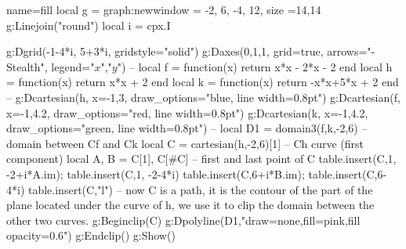 \documentclass[12pt]{standalone}
\begin{document}
\begin{luadraw}{name=fill}
local g = graph:new{window = {-2, 6, -4, 12}, size ={14,14}}
g:Linejoin("round")
local i = cpx.I 

g:Dgrid({-1-4*i, 5+3*i}, {gridstyle="solid"})
g:Daxes({0,1,1}, {grid=true, arrows="-Stealth", legend={"$x$","$y$"}})
--
local f = function(x) return x*x - 2*x - 2 end
local h = function(x) return x*x + 2 end
local k = function(x) return -x*x+5*x + 2 end
--
g:Dcartesian(h, {x={-1,3}, draw_options="blue, line width=0.8pt"})
g:Dcartesian(f, {x={-1,4.2}, draw_options="red, line width=0.8pt"})
g:Dcartesian(k, {x={-1,4.2}, draw_options="green, line width=0.8pt"})
--
local D1 = domain3(f,k,-2,6) -- domain between Cf and Ck
local C = cartesian(h,-2,6)[1] -- Ch curve (first component)
local A, B = C[1], C[#C] -- first and last point of C
table.insert(C,1, -2+i*A.im); table.insert(C,1, -2-4*i)
table.insert(C,6+i*B.im); table.insert(C,6-4*i)
table.insert(C,"l")
-- now C is a path, it is the contour of the part of the plane located under the curve of h, we use it to clip the domain between the other two curves.
g:Beginclip(C)
    g:Dpolyline(D1,"draw=none,fill=pink,fill opacity=0.6")
g:Endclip()
g:Show()
\end{luadraw}
\end{document}
